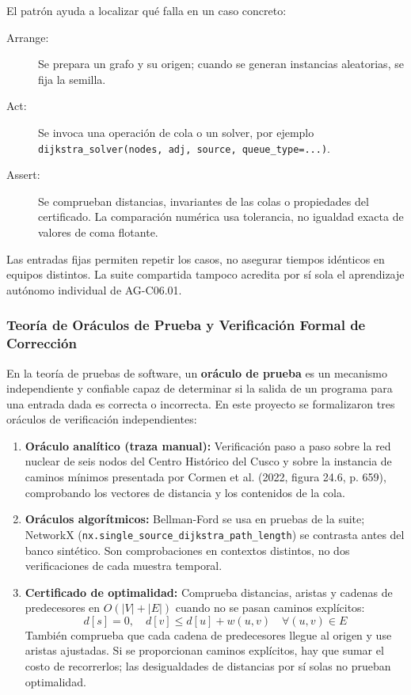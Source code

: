 El patrón ayuda a localizar qué falla en un caso concreto:
\begin{description}
    \item[Arrange:] Se prepara un grafo y su origen; cuando se generan instancias aleatorias, se fija la semilla.
    \item[Act:] Se invoca una operación de cola o un solver, por ejemplo \texttt{dijkstra\_solver(nodes, adj, source, queue\_type=...)}.
    \item[Assert:] Se comprueban distancias, invariantes de las colas o propiedades del certificado. La comparación numérica usa tolerancia, no igualdad exacta de valores de coma flotante.
\end{description}
Las entradas fijas permiten repetir los casos, no asegurar tiempos idénticos en equipos distintos. La suite compartida tampoco acredita por sí sola el aprendizaje autónomo individual de AG-C06.01.

\subsubsection{Teoría de Oráculos de Prueba y Verificación Formal de Corrección}
En la teoría de pruebas de software, un \textbf{oráculo de prueba} es un mecanismo independiente y confiable capaz de determinar si la salida de un programa para una entrada dada es correcta o incorrecta. En este proyecto se formalizaron tres oráculos de verificación independientes:
\begin{enumerate}
    \item \textbf{Oráculo analítico (traza manual):} Verificación paso a paso sobre la red nuclear de seis nodos del Centro Histórico del Cusco y sobre la instancia de caminos mínimos presentada por Cormen et al. (2022, figura 24.6, p. 659), comprobando los vectores de distancia y los contenidos de la cola.
    \item \textbf{Oráculos algorítmicos:} Bellman-Ford se usa en pruebas de la suite; NetworkX (\texttt{nx.single\_source\_dijkstra\_path\_length}) se contrasta antes del banco sintético. Son comprobaciones en contextos distintos, no dos verificaciones de cada muestra temporal.
    \item \textbf{Certificado de optimalidad:} Comprueba distancias, aristas y cadenas de predecesores en $O(|V|+|E|)$ cuando no se pasan caminos explícitos:
    \begin{equation}
        d[s] = 0, \quad d[v] \le d[u] + w(u, v) \quad \forall (u, v) \in E
    \end{equation}
    También comprueba que cada cadena de predecesores llegue al origen y use aristas ajustadas. Si se proporcionan caminos explícitos, hay que sumar el costo de recorrerlos; las desigualdades de distancias por sí solas no prueban optimalidad.
\end{enumerate}

